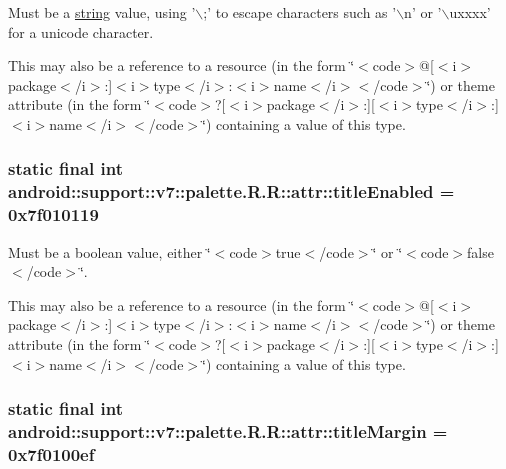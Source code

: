 Must be a \hyperlink{classandroid_1_1support_1_1v7_1_1palette_1_1_r_1_1string}{string} value, using '$\backslash$;' to escape characters such as '$\backslash$n' or '$\backslash$uxxxx' for a unicode character. 

This may also be a reference to a resource (in the form \char`\"{}$<$code$>$@\mbox{[}$<$i$>$package$<$/i$>$:\mbox{]}$<$i$>$type$<$/i$>$:$<$i$>$name$<$/i$>$$<$/code$>$\char`\"{}) or theme attribute (in the form \char`\"{}$<$code$>$?\mbox{[}$<$i$>$package$<$/i$>$:\mbox{]}\mbox{[}$<$i$>$type$<$/i$>$:\mbox{]}$<$i$>$name$<$/i$>$$<$/code$>$\char`\"{}) containing a value of this type. \hypertarget{classandroid_1_1support_1_1v7_1_1palette_1_1_r_1_1attr_eff1fe92594a95be73ec1777cb23c360}{
\subsubsection[{titleEnabled}]{\setlength{\rightskip}{0pt plus 5cm}static final int android::support::v7::palette.R.R::attr::titleEnabled = 0x7f010119}}
\label{classandroid_1_1support_1_1v7_1_1palette_1_1_r_1_1attr_eff1fe92594a95be73ec1777cb23c360}


Must be a boolean value, either \char`\"{}$<$code$>$true$<$/code$>$\char`\"{} or \char`\"{}$<$code$>$false$<$/code$>$\char`\"{}. 

This may also be a reference to a resource (in the form \char`\"{}$<$code$>$@\mbox{[}$<$i$>$package$<$/i$>$:\mbox{]}$<$i$>$type$<$/i$>$:$<$i$>$name$<$/i$>$$<$/code$>$\char`\"{}) or theme attribute (in the form \char`\"{}$<$code$>$?\mbox{[}$<$i$>$package$<$/i$>$:\mbox{]}\mbox{[}$<$i$>$type$<$/i$>$:\mbox{]}$<$i$>$name$<$/i$>$$<$/code$>$\char`\"{}) containing a value of this type. \hypertarget{classandroid_1_1support_1_1v7_1_1palette_1_1_r_1_1attr_f3b8f468f83893ba1743446a8f0e8bea}{
\subsubsection[{titleMargin}]{\setlength{\rightskip}{0pt plus 5cm}static final int android::support::v7::palette.R.R::attr::titleMargin = 0x7f0100ef}}
\label{classandroid_1_1support_1_1v7_1_1palette_1_1_r_1_1attr_f3b8f468f83893ba1743446a8f0e8bea}



